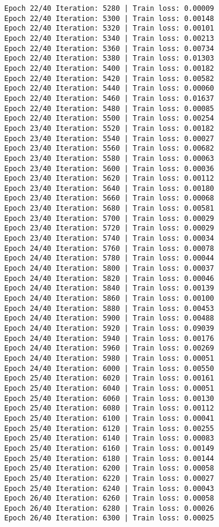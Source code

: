 \documentclass[11pt]{article}
\begin{document}
\begin{Verbatim}[commandchars=\\\{\}]
Epoch 22/40 Iteration: 5280 | Train loss: 0.00009
Epoch 22/40 Iteration: 5300 | Train loss: 0.00148
Epoch 22/40 Iteration: 5320 | Train loss: 0.00101
Epoch 22/40 Iteration: 5340 | Train loss: 0.00213
Epoch 22/40 Iteration: 5360 | Train loss: 0.00734
Epoch 22/40 Iteration: 5380 | Train loss: 0.01303
Epoch 22/40 Iteration: 5400 | Train loss: 0.00182
Epoch 22/40 Iteration: 5420 | Train loss: 0.00582
Epoch 22/40 Iteration: 5440 | Train loss: 0.00060
Epoch 22/40 Iteration: 5460 | Train loss: 0.01637
Epoch 22/40 Iteration: 5480 | Train loss: 0.00085
Epoch 22/40 Iteration: 5500 | Train loss: 0.00254
Epoch 23/40 Iteration: 5520 | Train loss: 0.00182
Epoch 23/40 Iteration: 5540 | Train loss: 0.00027
Epoch 23/40 Iteration: 5560 | Train loss: 0.00682
Epoch 23/40 Iteration: 5580 | Train loss: 0.00063
Epoch 23/40 Iteration: 5600 | Train loss: 0.00036
Epoch 23/40 Iteration: 5620 | Train loss: 0.00112
Epoch 23/40 Iteration: 5640 | Train loss: 0.00180
Epoch 23/40 Iteration: 5660 | Train loss: 0.00068
Epoch 23/40 Iteration: 5680 | Train loss: 0.00581
Epoch 23/40 Iteration: 5700 | Train loss: 0.00029
Epoch 23/40 Iteration: 5720 | Train loss: 0.00029
Epoch 23/40 Iteration: 5740 | Train loss: 0.00034
Epoch 24/40 Iteration: 5760 | Train loss: 0.00078
Epoch 24/40 Iteration: 5780 | Train loss: 0.00044
Epoch 24/40 Iteration: 5800 | Train loss: 0.00037
Epoch 24/40 Iteration: 5820 | Train loss: 0.00046
Epoch 24/40 Iteration: 5840 | Train loss: 0.00139
Epoch 24/40 Iteration: 5860 | Train loss: 0.00100
Epoch 24/40 Iteration: 5880 | Train loss: 0.00453
Epoch 24/40 Iteration: 5900 | Train loss: 0.00488
Epoch 24/40 Iteration: 5920 | Train loss: 0.09039
Epoch 24/40 Iteration: 5940 | Train loss: 0.00176
Epoch 24/40 Iteration: 5960 | Train loss: 0.00269
Epoch 24/40 Iteration: 5980 | Train loss: 0.00051
Epoch 24/40 Iteration: 6000 | Train loss: 0.00550
Epoch 25/40 Iteration: 6020 | Train loss: 0.00161
Epoch 25/40 Iteration: 6040 | Train loss: 0.00051
Epoch 25/40 Iteration: 6060 | Train loss: 0.00130
Epoch 25/40 Iteration: 6080 | Train loss: 0.00112
Epoch 25/40 Iteration: 6100 | Train loss: 0.00041
Epoch 25/40 Iteration: 6120 | Train loss: 0.00255
Epoch 25/40 Iteration: 6140 | Train loss: 0.00083
Epoch 25/40 Iteration: 6160 | Train loss: 0.00149
Epoch 25/40 Iteration: 6180 | Train loss: 0.00144
Epoch 25/40 Iteration: 6200 | Train loss: 0.00058
Epoch 25/40 Iteration: 6220 | Train loss: 0.00027
Epoch 25/40 Iteration: 6240 | Train loss: 0.00043
Epoch 26/40 Iteration: 6260 | Train loss: 0.00058
Epoch 26/40 Iteration: 6280 | Train loss: 0.00026
Epoch 26/40 Iteration: 6300 | Train loss: 0.00025

\end{Verbatim}
\end{document}
